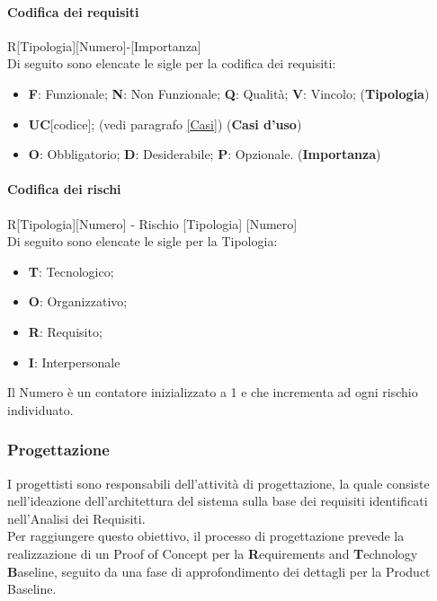 \paragraph{Codifica dei requisiti}

R[Tipologia][Numero]-[Importanza] \\
Di seguito sono elencate le sigle per la codifica dei requisiti: 
\begin{itemize}
    \item \textbf{F}: Funzionale; \textbf{N}: Non Funzionale; \textbf{Q}: Qualità; \textbf{V}: Vincolo; (\textbf{Tipologia})
    \item \textbf{UC}[codice]; (vedi paragrafo \ref{Casi}) (\textbf{Casi d'uso})
    \item \textbf{O}: Obbligatorio; \textbf{D}: Desiderabile; \textbf{P}: Opzionale. (\textbf{Importanza})
\end{itemize}

\paragraph{Codifica dei rischi}\label{codRischi}

R[Tipologia][Numero] - Rischio [Tipologia] [Numero] \\
Di seguito sono elencate le sigle per la Tipologia: 
\begin{itemize}
    \item \textbf{T}: Tecnologico;
    \item \textbf{O}: Organizzativo;
    \item \textbf{R}: Requisito;
    \item \textbf{I}: Interpersonale
\end{itemize}
Il Numero è un contatore inizializzato a 1 e che incrementa ad ogni rischio individuato.

\subsubsection{Progettazione}\label{Prog}
I progettisti sono responsabili dell'attività di progettazione, la quale consiste nell'ideazione dell'architettura del sistema sulla base dei requisiti 
identificati nell'Analisi dei Requisiti. \\
Per raggiungere questo obiettivo, il processo di progettazione prevede la realizzazione di un Proof of Concept\glo 
per la \textbf{R}equirements and \textbf{T}echnology \textbf{B}aseline, seguito da una fase di approfondimento dei dettagli per la Product Baseline.


